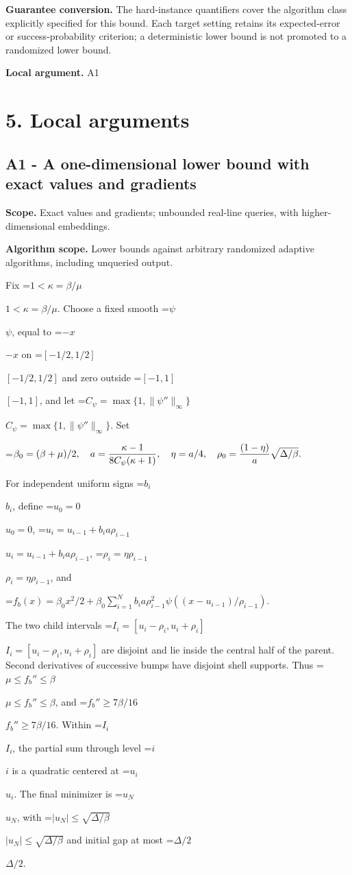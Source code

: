 \documentclass[10pt,a4paper]{article}
\newcommand{\AtlasMath}[1]{\par\begingroup\centering\setbox0=\hbox{$\displaystyle #1$}\ifdim\wd0>1.4\linewidth\typeout{ATLAS WIDE FORMULA: \the\wd0}\fi\ifdim\wd0>\linewidth\resizebox{\linewidth}{!}{\box0}\else\box0\fi\par\endgroup}
\newcommand{\AtlasInlineMath}[1]{\begingroup\setbox0=\hbox{$#1$}\ifdim\wd0>.4\linewidth\endgroup\AtlasMath{#1}\else\endgroup$#1$\fi}
\begin{document}
\textbf{Guarantee conversion.} The hard-instance quantifiers cover the algorithm class explicitly specified for this bound. Each target setting retains its expected-error or success-probability criterion; a deterministic lower bound is not promoted to a randomized lower bound.

\textbf{Local argument.} A1

\section{5. Local arguments}
\subsection{A1 - A one-dimensional lower bound with exact values and gradients}
\textbf{Scope.} Exact values and gradients; unbounded real-line queries, with higher-dimensional embeddings.

\textbf{Algorithm scope.} Lower bounds against arbitrary randomized adaptive algorithms, including unqueried output.

Fix \AtlasInlineMath{1<\kappa=\beta/\mu}. Choose a fixed smooth \AtlasInlineMath{\psi}, equal to \AtlasInlineMath{-x} on \AtlasInlineMath{[-1/2,1/2]} and zero outside \AtlasInlineMath{[-1,1]}, and let \AtlasInlineMath{C_\psi=\max\{1,\|\psi''\|_\infty\}}. Set

\AtlasMath{\beta_0=(\beta+\mu)/2,\quad a={\kappa-1\over8C_\psi(\kappa+1)},\quad
\eta=a/4,\quad \rho_0={(1-\eta)\over a}\sqrt{\Delta/\beta}.}

For independent uniform signs \AtlasInlineMath{b_i}, define \AtlasInlineMath{u_0=0},
\AtlasInlineMath{u_i=u_{i-1}+b_i a\rho_{i-1}}, \AtlasInlineMath{\rho_i=\eta\rho_{i-1}}, and

\AtlasMath{f_b(x)=\beta_0x^2/2+
\beta_0\sum_{i=1}^N b_i a\rho_{i-1}^2
\psi((x-u_{i-1})/\rho_{i-1}).}

The two child intervals \AtlasInlineMath{I_i=[u_i-\rho_i,u_i+\rho_i]} are disjoint and lie inside the central half of the parent. Second derivatives of successive bumps have disjoint shell supports. Thus \AtlasInlineMath{\mu\le f_b''\le\beta}, and \AtlasInlineMath{f_b''\ge7\beta/16}. Within \AtlasInlineMath{I_i}, the partial sum through level \AtlasInlineMath{i} is a quadratic centered at \AtlasInlineMath{u_i}. The final minimizer is \AtlasInlineMath{u_N}, with \AtlasInlineMath{|u_N|\le\sqrt{\Delta/\beta}} and initial gap at most \AtlasInlineMath{\Delta/2}.
\end{document}
